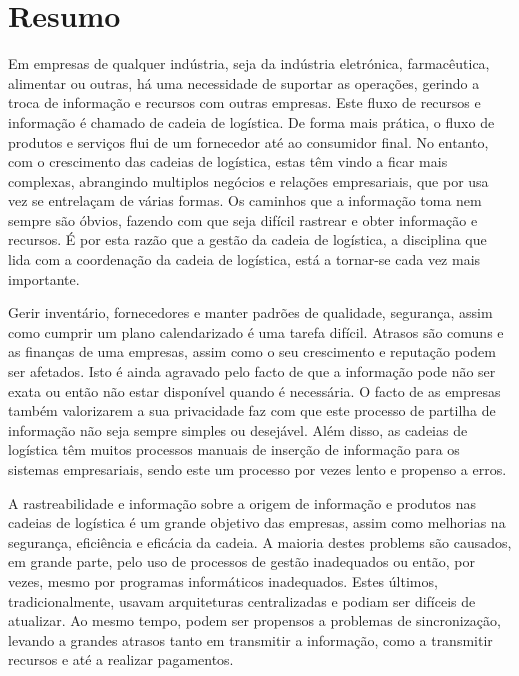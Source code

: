 \chapter{Resumo}
Em empresas de qualquer indústria, seja da indústria eletrónica, farmacêutica, alimentar ou outras, há uma necessidade de suportar as operações, gerindo a troca de informação e recursos com outras empresas. Este fluxo de recursos e informação é chamado de cadeia de logística. De forma mais prática, o fluxo de produtos e serviços flui de um fornecedor até ao consumidor final. No entanto, com o crescimento das cadeias de logística, estas têm vindo a ficar mais complexas, abrangindo multiplos negócios e relações empresariais, que por usa vez se entrelaçam de várias formas. Os caminhos que a informação toma nem sempre são óbvios, fazendo com que seja difícil rastrear e obter informação e recursos. É por esta razão que a gestão da cadeia de logística, a disciplina que lida com a coordenação da cadeia de logística, está a tornar-se cada vez mais importante. 

Gerir inventário, fornecedores e manter padrões de qualidade, segurança, assim como cumprir um plano calendarizado é uma tarefa difícil. Atrasos são comuns e as finanças de uma empresas, assim como o seu crescimento e reputação podem ser afetados. Isto é ainda agravado pelo facto de que a informação pode não ser exata ou então não estar disponível quando é necessária. O facto de as empresas também valorizarem a sua privacidade faz com que este processo de partilha de informação não seja sempre simples ou desejável. Além disso, as cadeias de logística têm muitos processos manuais de inserção de informação para os sistemas empresariais, sendo este um processo por vezes lento e propenso a erros.

A rastreabilidade e informação sobre a origem de informação e produtos nas cadeias de logística é um grande objetivo das empresas, assim como melhorias na segurança, eficiência e eficácia da cadeia. A maioria destes problems são causados, em grande parte, pelo uso de processos de gestão inadequados ou então, por vezes, mesmo por programas informáticos inadequados. Estes últimos, tradicionalmente, usavam arquiteturas centralizadas e podiam ser difíceis de atualizar. Ao mesmo tempo, podem ser propensos a problemas de sincronização, levando a grandes atrasos tanto em transmitir a informação, como a transmitir recursos e até a realizar pagamentos.

